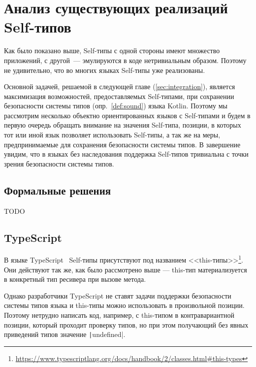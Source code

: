 \section{Анализ существующих реализаций Self-типов}

Как было показано выше, Self-типы с одной стороны имеют множество приложений, с другой~--- эмулируются в коде нетривиальным образом.
Поэтому не удивительно, что во многих языках Self-типы уже реализованы.

Основной задачей, решаемой в следующей главе (\ref{sec:integration}), является максимизация возможностей, предоставляемых Self-типами, при сохранении безопасности системы типов (опр.~\ref{def:sound}) языка Kotlin.
Поэтому мы рассмотрим несколько объектно ориентированных языков с Self-типами и будем в первую очередь обращать внимание на значения Self-типа, позиции, в которых тот или иной язык позволяет использовать Self-типы, а так же на меры, предпринимаемые для сохранения безопасности системы типов.
В завершение увидим, что в языках без наследования поддержка Self-типов тривиальна с точки зрения безопасности системы типов.

\subsection{Формальные решения} \label{subsec:formal-solutions}

TODO %

\subsection{TypeScript}

В языке TypeScript~\cite{bierman2014understanding} Self-типы присутствуют под названием <<this-типы>>\footnote{\url{https://www.typescriptlang.org/docs/handbook/2/classes.html\#this-types}}.
Они действуют так же, как было рассмотрено выше --- this-тип материализуется в конкретный тип ресивера при вызове метода.

Однако разработчики TypeScript не ставят задачи поддержки безопасности системы типов языка и this-типы можно использовать в произвольной позиции.
Поэтому нетрудно написать код, например, с this-типом в контравариантной позиции, который проходит проверку типов, но при этом получающий без явных приведений типов значение \texttt|undefined|.

